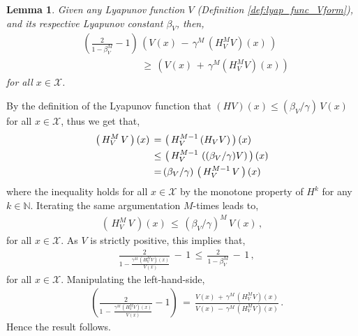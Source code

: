 \documentclass[journal]{IEEEtran}
\newtheorem{lemma}[theorem]{Lemma}
\newcommand{\kcol}[1]{{\color{black}#1}}
\newcommand{\mbb}{\mathbb}
\newcommand{\xinX}{x\!\in\!\mathcal{X}}
\begin{document}
\vspace{0.2cm}


\begin{lemma} \label{lemma:lyapunov_function_bound_V_HV}
	Given any Lyapunov function $V$ (Definition \ref{def:lyap_func_Vform}), and its respective Lyapunov constant $\beta_{V}$, then,
	\begin{equation} \nonumber
		\begin{aligned}
			&\left( \frac{2}{1-\beta^{M}_{V} } - 1 \right) \,
				\left( V(x)\,-\, \gamma^M \, (H_V^M V)(x) \, \right)
			\\
			&\qquad\qquad\qquad \geq\,	
				\left( V(x) \,+\, \gamma^M (H_V^M V)(x) \right)
		\end{aligned}
	\end{equation}
	for all $\xinX$.
\end{lemma}

\vspace{0.2cm}

\begin{IEEEproof}
By the definition of the Lyapunov function that $(HV)(x) \leq (\beta_V/\gamma) \, V(x)$ for all $\xinX$, thus we get that,
	\begin{equation} \nonumber
		\begin{aligned}
			 \left(\, H_V^{M} \, V \,\right)(x)
				\,=&\, \left(\, H_V^{M-1} \, (H_V V) \,\right)(x)
			\\
			\kcol{\leq}&\, \left(\, H_V^{M-1} \, \left( (\beta_{V}/\gamma) V \right) \,\right)(x)
			\\
			=&\, (\beta_{V}/\gamma) \, \left(\, H_V^{M-1} \, V \,\right)(x)
		\end{aligned}
	\end{equation}
	where the inequality holds for all $\xinX$ by the monotone property of $H^k$ for any $k\in\mbb{N}$. Iterating the same argumentation $M$-times leads to,
	\begin{equation} \nonumber
		\begin{aligned}
			\left(\, H_V^{M} \, V \,\right)(x)
				\,\leq\, \left(\beta_{V}/\gamma\right)^M \, V(x)
				\,,
		\end{aligned}
	\end{equation}
for all $\xinX$. As $V$ is strictly positive, this implies that,
	\begin{equation} \nonumber
		\begin{aligned}
			&\, \frac{2}{1-\frac{\gamma^M \, (H_V^M V)(x)}{V(x)}} \,-\, 1 \,\leq\, \frac{2}{1-\beta_V^{M}} \,-\, 1
				\,,
		\end{aligned}
	\end{equation}
for all $\xinX$. Manipulating the left-hand-side,
	\begin{equation} \nonumber
		\begin{aligned}
			&\, \left( \frac{2}{ 1 \,-\, \frac{\gamma^M \, (H_V^M V)(x)}{V(x)} } - 1 \right)
				\,=\,
				\frac{V(x) \,+\, \gamma^M \, (H_V^M V)(x)}{ V(x) \,-\, \gamma^M \, (H_V^M V)(x) }
				\,.
		\end{aligned}
	\end{equation}
Hence the result follows.
\end{IEEEproof}
\end{document}
